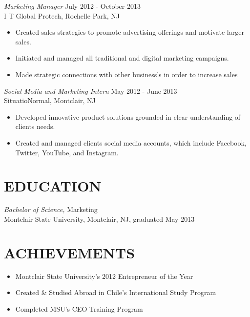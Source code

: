 \documentclass[margin]{res}
\begin{document}
\begin{resume}
                {\sl Marketing Manager} \hfill July 2012 - October 2013 \\
                I T Global Protech, Rochelle Park, NJ
                 \begin{itemize}  \itemsep -2pt %
                 \item Created sales strategies to promote advertising offerings and motivate larger sales.
                 \item Initiated and
managed all traditional and digital marketing campaigns.
                 \item Made strategic connections with other
business's in order to increase sales
                 \end{itemize}
                 
               {\sl Social Media and Marketing Intern} \hfill            May 2012 - June 2013 \\
                SituatioNormal, Montclair, NJ
                 \begin{itemize}  \itemsep -2pt %
                 \item Developed innovative product solutions grounded in clear
understanding of clients needs.
                 \item Created and managed clients social media accounts, which include
Facebook, Twitter, YouTube, and Instagram.
                 \end{itemize} 
 
\section{EDUCATION} {\sl Bachelor of Science,} Marketing \\
                Montclair State University, Montclair, NJ, 
                graduated May 2013 \\
\section{ACHIEVEMENTS}
\begin{itemize} 

		\item Montclair State University's 2012 Entrepreneur of the Year
		\item Created \& Studied Abroad in Chile's International Study Program
		\item Completed MSU's CEO Training Program 
					                
					                 
\end{itemize}

\end{resume}
\end{document}
